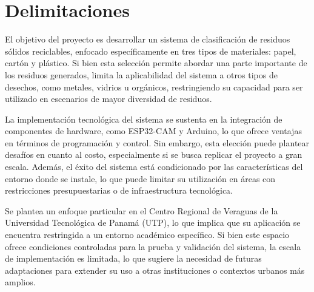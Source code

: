 \section{Delimitaciones}
El objetivo del proyecto es desarrollar un sistema de clasificación de residuos sólidos reciclables, enfocado específicamente en tres tipos de materiales: papel, cartón y plástico. Si bien esta selección permite abordar una parte importante de los residuos generados, limita la aplicabilidad del sistema a otros tipos de desechos, como metales, vidrios u orgánicos, restringiendo su capacidad para ser utilizado en escenarios de mayor diversidad de residuos.

La implementación tecnológica del sistema se sustenta en la integración de componentes de hardware, como ESP32-CAM y Arduino, lo que ofrece ventajas en términos de programación y control. Sin embargo, esta elección puede plantear desafíos en cuanto al costo, especialmente si se busca replicar el proyecto a gran escala. Además, el éxito del sistema está condicionado por las características del entorno donde se instale, lo que puede limitar su utilización en áreas con restricciones presupuestarias o de infraestructura tecnológica. 

Se plantea un enfoque particular en el Centro Regional de Veraguas de la Universidad Tecnológica de Panamá (UTP), lo que implica que su aplicación se encuentra restringida a un entorno académico específico. Si bien este espacio ofrece condiciones controladas para la prueba y validación del sistema, la escala de implementación es limitada, lo que sugiere la necesidad de futuras adaptaciones para extender su uso a otras instituciones o contextos urbanos más amplios.